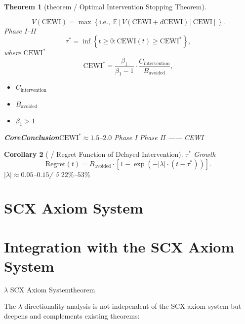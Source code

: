 \documentclass[11pt,a4paper]{article}
\newtheorem{theorem}{Theorem}[section]
\newtheorem{corollary}[theorem]{Corollary}
\theoremstyle{remark}
\newcommand{\E}{\mathbb{E}}
\newcommand{\paren}[1]{\left(#1\right)}
\newcommand{\bracket}[1]{\left[#1\right]}
\newcommand{\set}[1]{\left\{#1\right\}}
\newcommand{\lambdaparam}{\lambda}
\newcommand{\given}{\,|\,}
\begin{document}
\begin{theorem}[theorem / Optimal Intervention Stopping Theorem]
\label{thm:optimal_timing}

\[
V(\text{CEWI}) = \max\set{\text{i.e.},\; \E[V(\text{CEWI} + d\text{CEWI}) \given \text{CEWI}]}.
\]
 Phase I--II 
\[
\tau^* = \inf\set{t \geq 0 : \text{CEWI}(t) \geq \text{CEWI}^*},
\]
where $\text{CEWI}^*$ 
\[
\text{CEWI}^* = \frac{\beta_1}{\beta_1 - 1} \cdot \frac{C_{\text{intervention}}}{B_{\text{avoided}}},
\]

\begin{itemize}
    \item $C_{\text{intervention}}$
    \item $B_{\text{avoided}}$
    \item $\beta_1 > 1$
\end{itemize}
\textbf{CoreConclusion}$\text{CEWI}^* \approx 1.5$--$2.0$
 Phase I  Phase II ——
 CEWI 

\end{theorem}

\begin{corollary}[ / Regret Function of Delayed Intervention]
\label{cor:regret}
 $\tau^*$ Growth
\[
\text{Regret}(t) = B_{\text{avoided}} \cdot 
\bracket{1 - \exp\paren{-|\lambdaparam| \cdot (t - \tau^*)}}.
\]
$|\lambdaparam| \approx 0.05$--$0.15$/
 5  $22\%$--$53\%$ 
\end{corollary}

\section{ SCX Axiom System}
\section{Integration with the SCX Axiom System}

$\lambdaparam$  SCX Axiom Systemtheorem

The $\lambdaparam$ directionality analysis is not independent of the SCX axiom system
but deepens and complements existing theorems:
\end{document}
